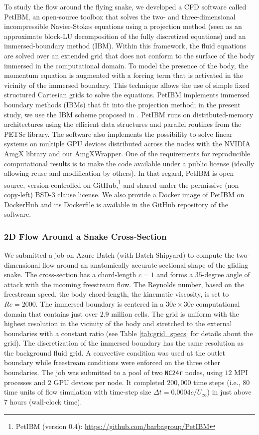 \documentclass[10pt,journal,compsoc]{IEEEtran}
\begin{document}
To study the flow around the flying snake, we developed a CFD software called PetIBM\cite{chuang_et_al_2018}, an open-source toolbox that solves the two- and three-dimensional incompressible Navier-Stokes equations using a projection method (seen as an approximate block-LU decomposition of the fully discretized equations\cite{perot_1993}) and an immersed-boundary method (IBM).
Within this framework, the fluid equations are solved over an extended grid that does not conform to the surface of the body immersed in the computational domain.
To model the presence of the body, the momentum equation is augmented with a forcing term that is activated in the vicinity of the immersed boundary.
This technique allows the use of simple fixed structured Cartesian grids to solve the equations.
PetIBM implements immersed boundary methods (IBMs) that fit into the projection method; in the present study, we use the IBM scheme proposed in \cite{li_et_al_2016}.
PetIBM runs on distributed-memory architectures using the efficient data structures and parallel routines from the PETSc library.
The software also implements the possibility to solve linear systems on multiple GPU devices distributed across the nodes with the NVIDIA AmgX library and our AmgXWrapper\cite{chuang_barba_2017}.
One of the requirements for reproducible computational results is to make the code available under a public license (ideally allowing reuse and modification by others).
In that regard, PetIBM is open source, version-controlled on GitHub,\footnote{PetIBM (version 0.4): \url{https://github.com/barbagroup/PetIBM}} and shared under the permissive (non copy-left) BSD-3 clause license.
We also provide a Docker image of PetIBM on DockerHub and its Dockerfile is available in the GitHub repository of the software.

\subsubsection{2D Flow Around a Snake Cross-Section}

We submitted a job on Azure Batch (with Batch Shipyard) to compute the two-dimensional flow around an anatomically accurate sectional shape of the gliding snake.
The cross-section has a chord-length $c=1$ and forms a $35$-degree angle of attack with the incoming freestream flow.
The Reynolds number, based on the freestream speed, the body chord-length, the kinematic viscosity, is set to $Re=2000$.
The immersed boundary is centered in a $30c \times 30c$ computational domain that contains just over $2.9$ million cells.
The grid is uniform with the highest resolution in the vicinity of the body and stretched to the external boundaries with a constant ratio (see Table \ref{tab:grid_specs} for details about the grid).
The discretization of the immersed boundary has the same resolution as the background fluid grid.
A convective condition was used at the outlet boundary while freestream conditions were enforced on the three other boundaries.
The job was submitted to a pool of two \texttt{NC24r} nodes, using $12$ MPI processes and $2$ GPU devices per node.
It completed $200,000$ time steps (i.e., $80$ time units of flow simulation with time-step size $\Delta t = 0.0004 c / U_\infty$) in just above $7$ hours (wall-clock time).
\end{document}
